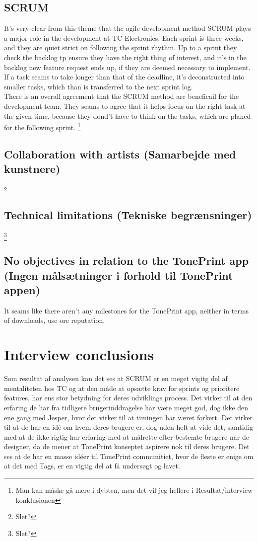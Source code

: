 \subsection*{SCRUM}
\label{ThemeScrum}
It's very clear from this theme that the agile development method SCRUM plays a major role in the development at TC Electronics. Each sprint is three weeks, and they are quiet strict on following the sprint rhythm. Up to a sprint they check the backlog tp ensure they have the right thing of interest, and it's in the backlog new feature request ends up, if they are deemed necessary to implement. If a task seams to take longer than that of the deadline, it's deconstructed into smaller tasks, which than is transferred to the next sprint log.\\
There is an overall agreement that the SCRUM method are beneficail for the development team. They seams to agree that it helps focus on the right task at the given time, because they dond't have to think on the tasks, which are planed for the following sprint. \footnote{Man kan måske gå mere i dybten, men det vil jeg hellere i Resultat/interview konklusionen} 

\subsection*{Collaboration with artists (Samarbejde med kunstnere)} 
\label{ThemeCollaborationWithArtists}
\footnote{Slet?}

\subsection*{Technical limitations (Tekniske begrænsninger)} 
\label{ThemeTechnicalLimitations}
\footnote{Slet?}

\subsection*{No objectives in relation to the TonePrint app (Ingen målsætninger i forhold til TonePrint appen)} 
\label{ThemeNoObjectivesInRelationToTheTonePrintApp}
It seams like there aren't any milestones for the TonePrint app, neither in terms of downloads, use ore reputation. 

\section{Interview conclusions}
\label{InterviewConclusion}
Som resultat af analysen kan det ses at SCRUM er en meget vigitg del af mentaliteten hos TC og at den måde at opsætte krav for sprints og prioritere features, har ens stor betydning for deres udviklings process. Det virker til at den erfaring de har fra tidligere brugerinddragelse har være meget god, dog ikke den ene gang med Jesper, hvor det virker til at timingen har været forkert. Det virker til at de har en idé om hvem deres brugere er, dog uden helt at vide det, samtidig med at de ikke rigtig har erfaring med at målrette efter bestemte brugere når de designer, da de mener at TonePrint konseptet aspirere nok til deres brugere. Det ses at de har en masse idéer til TonePrint communitiet, hvor de fleste er enige om at det med Tags, er en vigtig del at få undersøgt og lavet.
